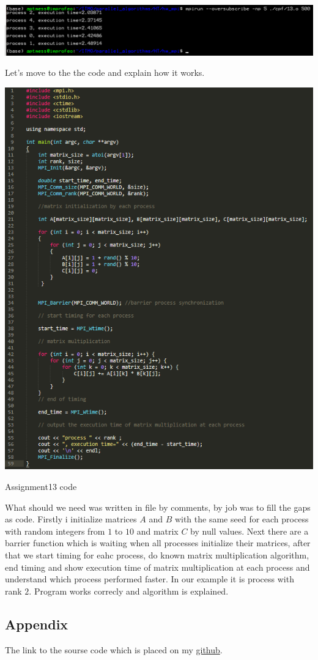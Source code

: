 \documentclass[%
12pt, %
final, %
oneside, %
onecolumn, %
centertags]{article} %
\theoremstyle{plain}
\theoremstyle{definition}
\theoremstyle{remark}
\begin{document}
\begin{center}
\includegraphics[scale=0.55]{13.png}
\end{center}

Let's move to the the code and explain how it works.

\begin{center}
\includegraphics[scale=0.8]{13.code.png}

Assignment13 code
\end{center}

What should we need was written in file by comments, by job was to fill the gaps as code. Firstly i initialize matrices $A$ and $B$ with the same seed for each process with random integers from $1$ to $10$ and matrix $C$ by null values. Next there are a barrier function which is waiting when all processes initialize their matrices, after that we start timing for eahc process, do known matrix multiplication algorithm, end timing and show execution time of matrix multiplication at each process and understand which process performed faster. In our example it is process with rank $2$. Program works correcly and algorithm is explained.

\subsection{Appendix}

The link to the sourse code which is placed on my \href{https://github.com/aptmess/parallel_algorithms}{github}.
\end{document}
